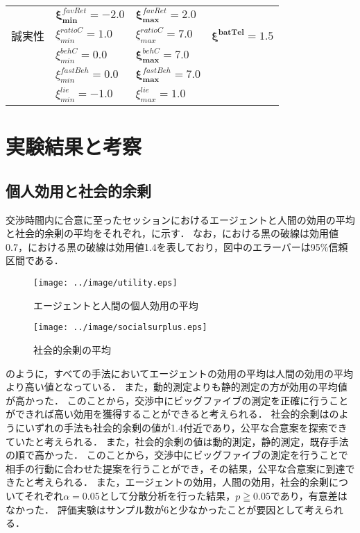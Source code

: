 \begin{table}[!tb]
\begin{tabular}{llll}
        & $\bm{\xi_{min}^{\mathit{favRet}} = -2.0}$ & $\bm{\xi_{max}^{\mathit{favRet}} = 2.0}$ \\
        誠実性 & $\xi_{min}^{\mathit{ratioC}} = 1.0$ & $\xi_{max}^{\mathit{ratioC}} = 7.0$ & $\bm{\xi^{batTel} = 1.5}$ \\
        & $\xi_{min}^{\mathit{behC}} = 0.0$ & $\bm{\xi_{max}^{\mathit{behC}} = 7.0}$ \\
        & $\xi_{min}^{\mathit{fastBeh}} = 0.0$ & $\bm{\xi_{max}^{\mathit{fastBeh}} = 7.0}$ \\
        & $\xi_{min}^{\mathit{lie}} = -1.0$ & $\xi_{max}^{\mathit{lie}} = 1.0$ \\ \bottomrule
    \end{tabular}
    \label{tab:xi-param}
\end{table}

\section{実験結果と考察}
\subsection{個人効用と社会的余剰}
交渉時間内に合意に至ったセッションにおけるエージェントと人間の効用の平均と社会的余剰の平均をそれぞれ，に示す．
なお，における黒の破線は効用値0.7，における黒の破線は効用値1.4を表しており，図中のエラーバーは95\%信頼区間である．

\begin{figure}[bt]
    \begin{minipage}[b]{0.47\linewidth}
        \centering
        \texttt{[image: ../image/utility.eps]}
        \caption{エージェントと人間の個人効用の平均}\label{fig:util}
    \end{minipage}
    \begin{minipage}[b]{0.47\linewidth}
        \centering
        \texttt{[image: ../image/socialsurplus.eps]}
        \caption{社会的余剰の平均}\label{fig:socialsurplus}
    \end{minipage}
\end{figure}

のように，すべての手法においてエージェントの効用の平均は人間の効用の平均より高い値となっている．
また，動的測定よりも静的測定の方が効用の平均値が高かった．
このことから，交渉中にビッグファイブの測定を正確に行うことができれば高い効用を獲得することができると考えられる．
社会的余剰はのようにいずれの手法も社会的余剰の値が1.4付近であり，公平な合意案を探索できていたと考えられる．
また，社会的余剰の値は動的測定，静的測定，既存手法の順で高かった．
このことから，交渉中にビッグファイブの測定を行うことで相手の行動に合わせた提案を行うことができ，その結果，公平な合意案に到達できたと考えられる．
また，エージェントの効用，人間の効用，社会的余剰についてそれぞれ$\alpha = 0.05$として分散分析を行った結果，$p \geqq 0.05$であり，有意差はなかった．
評価実験はサンプル数が6と少なかったことが要因として考えられる．

